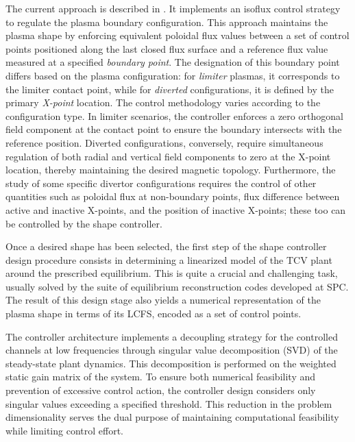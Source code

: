 The current approach is described in \cite{mele_design_2024}. It implements an isoflux control strategy to regulate the plasma boundary configuration. This approach maintains the plasma shape by enforcing equivalent poloidal flux values between a set of control points positioned along the last closed flux surface and a reference flux value measured at a specified \emph{boundary point}. The designation of this boundary point differs based on the plasma configuration: for \emph{limiter} plasmas, it corresponds to the limiter contact point, while for \emph{diverted} configurations, it is defined by the primary \emph{X-point} location. The control methodology varies according to the configuration type. In limiter scenarios, the controller enforces a zero orthogonal field component at the contact point to ensure the boundary intersects with the reference position. Diverted configurations, conversely, require simultaneous regulation of both radial and vertical field components to zero at the X-point location, thereby maintaining the desired magnetic topology. Furthermore, the study of some specific divertor configurations requires the control of other quantities such as poloidal flux at non-boundary points, flux difference between active and inactive X-points, and the position of inactive X-points; these too can be controlled by the shape controller.

Once a desired shape has been selected, the first step of the shape controller design procedure consists in determining a linearized model of the TCV plant around the prescribed equilibrium. This is quite a crucial and challenging task, usually solved by the suite of equilibrium reconstruction codes developed at SPC. The result of this design stage also yields a numerical representation of the plasma shape in terms of its LCFS, encoded as a set of control points.

The controller architecture implements a decoupling strategy for the controlled channels at low frequencies through singular value decomposition (SVD) of the steady-state plant dynamics. This decomposition is performed on the weighted static gain matrix of the system. To ensure both numerical feasibility and prevention of excessive control action, the controller design considers only singular values exceeding a specified threshold. This reduction in the problem dimensionality serves the dual purpose of maintaining computational feasibility while limiting control effort.

